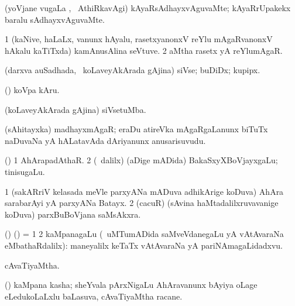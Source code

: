 \bentry
{} 
\gl{\kirxvi}
\expl{}
\bmng
 (yoVjane \mo vugaLa \vi, \kanmu\ AthiRkavAgi) kAyaRsAdhayxvAguvaMte; kAyaRrUpakekx baralu sAdhayxvAguvaMte. 
\emng
\eentry

\bentry
{} 
\gl{\nA}
\expl{}
\bmng
\bnum
\num{1} (kaNive, haLaLx, \mo vanunx hAyalu, rasetxyanonxV reYlu mAgaRvanonxV hAkalu kaTiTxda) kamAnusAlina seVtuve. 
\num{2} aMtha rasetx yA reYlumAgaR. 
\enum
\emng
\eentry

\bentry
{} 
\gl{\nA}
\expl{}
\bmng
 (darxva auSadhada, \sA\ koLaveyAkArada gAjina) siVse; buDiDx; kupipx. 
\emng

\noindent
\gl{\pagu}
\bmng
{} (\AmA) koVpa kAru. 
\emng
\eentry

\bentry
{} 
\gl{\nA}
\bmng
 (koLaveyAkArada gAjina) siVsetuMba. 
\emng
\eentry

\bentry 
{} 
\gl{\nA}
\expl{\Latin}
\bmng
 (sAhitayxka) madhayxmAgaR; eraDu atireVka mAgaRgaLanunx biTuTx naDuvaNa yA hALatavAda dAriyanunx anusarisuvudu. 
\emng
\eentry

\bentry
{} 
\gl{\nA}
\expl{}
\bmng
 (\aupa) 
\bnum
\num{1} AhArapadAthaR. 
\num{2} (\sA\ \bava dalilx) (aDige mADida) BakaSxyXBoVjayxgaLu; tinisugaLu. 
\enum
\emng
\eentry

\bentry
{} 
\gl{\nA}
\bmng
\bnum
\num{1} (sakARriV kelasada meVle parxyANa mADuva adhikArige koDuva) AhAra sarabarAyi yA parxyANa Batayx. 
\num{2} (cacuR) (sAvina haMtadalilxruvavanige koDuva) parxBuBoVjana saMsAkxra. 
\enum
\emng
\eentry

\bentry
{} 
\gl{\nA}
\expl{}
\bmng
(\bava) (\AmA) = 
\bnum
\num{1}  
\num{2} kaMpanagaLu (\kanmu\ uMTumADida saMveVdanegaLu yA vAtAvaraNa eMbathaRdalilx):  maneyalilx keTaTx vAtAvaraNa yA pariNAmagaLidadxvu. 
\enum
\emng
\eentry

\bentry
{} 
\gl{\gu}
\expl{}
\bmng
 cAvaTiyaMtha. 
\emng
\eentry

\bentry
{} 
\gl{\nA}
\bmng
 (\pArxvi) kaMpana kasha; sheYvala pArxNigaLu AhAravanunx bAyiya oLage eLedukoLaLxlu baLasuva, cAvaTiyaMtha racane.  
\emng
\eentry

